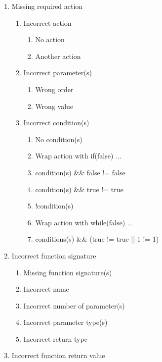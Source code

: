 \begin{enumerate}
    \item Missing required action
    \begin{enumerate}
        \item Incorrect action
            \begin{enumerate}
                \item No action
                \item Another action
            \end{enumerate}
        \item Incorrect parameter(s)
            \begin{enumerate}
                \item Wrong order
                \item Wrong value
            \end{enumerate}
        \item Incorrect condition(s)
            \begin{enumerate}
                \item No condition(s)
                \item Wrap action with if(false){ ... }
                \item condition(s) \&\& false != false
                \item condition(s) \&\& true != true
                \item !condition(s)
                \item Wrap action with while(false){ ... }
                \item conditions(s) \&\& (true != true || 1 != 1)
            \end{enumerate}
    \end{enumerate}
    \item Incorrect function signature
    \begin{enumerate}
        \item Missing function signature(s)
        \item Incorrect name
        \item Incorrect number of  parameter(s)
        \item Incorrect parameter type(s)
        \item Incorrect return type
    \end{enumerate}
    \item Incorrect function return value
\end{enumerate}

